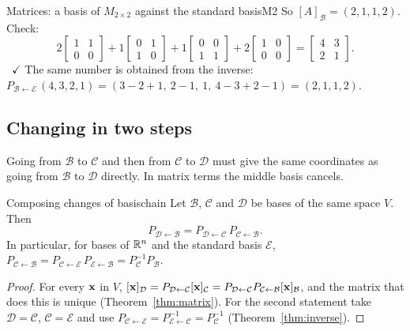 \documentclass[11pt]{article}
\begin{document}
\begin{exmp}{Matrices: a basis of $M_{2\times2}$ against the standard basis}{M2}
So $[A]_{\mathcal{B}}=(2,1,1,2)$. Check:
\[
2\begin{bmatrix}1&1\\0&0\end{bmatrix}+1\begin{bmatrix}0&1\\1&0\end{bmatrix}+1\begin{bmatrix}0&0\\1&1\end{bmatrix}+2\begin{bmatrix}1&0\\0&0\end{bmatrix}=\begin{bmatrix}4&3\\2&1\end{bmatrix}.
\]
\ $\checkmark$ The same number is obtained from the inverse: $P_{\mathcal{B}\leftarrow\mathcal{E}}\,(4,3,2,1)=(3-2+1,\ 2-1,\ 1,\ 4-3+2-1)=(2,1,1,2)$.
\end{exmp}

\subsection*{Changing in two steps}

Going from $\mathcal{B}$ to $\mathcal{C}$ and then from $\mathcal{C}$ to $\mathcal{D}$ must give the same coordinates as going from $\mathcal{B}$ to $\mathcal{D}$ directly. In matrix terms the middle basis cancels.

\begin{thm}{Composing changes of basis}{chain}
Let $\mathcal{B}$, $\mathcal{C}$ and $\mathcal{D}$ be bases of the same space $V$. Then
\[
P_{\mathcal{D}\leftarrow\mathcal{B}}=P_{\mathcal{D}\leftarrow\mathcal{C}}\,P_{\mathcal{C}\leftarrow\mathcal{B}}.
\]
In particular, for bases of $\mathbb{R}^n$ and the standard basis $\mathcal{E}$, $P_{\mathcal{C}\leftarrow\mathcal{B}}=P_{\mathcal{C}\leftarrow\mathcal{E}}\,P_{\mathcal{E}\leftarrow\mathcal{B}}=P_{\mathcal{C}}^{-1}P_{\mathcal{B}}$.
\end{thm}

\begin{proof}
For every $\mathbf{x}$ in $V$, $[\mathbf{x}]_{\mathcal{D}}=P_{\mathcal{D}\leftarrow\mathcal{C}}[\mathbf{x}]_{\mathcal{C}}=P_{\mathcal{D}\leftarrow\mathcal{C}}P_{\mathcal{C}\leftarrow\mathcal{B}}[\mathbf{x}]_{\mathcal{B}}$, and the matrix that does this is unique (Theorem~\ref{thm:matrix}). For the second statement take $\mathcal{D}=\mathcal{C}$, $\mathcal{C}=\mathcal{E}$ and use $P_{\mathcal{C}\leftarrow\mathcal{E}}=P_{\mathcal{E}\leftarrow\mathcal{C}}^{-1}=P_{\mathcal{C}}^{-1}$ (Theorem~\ref{thm:inverse}).
\end{proof}
\end{document}
